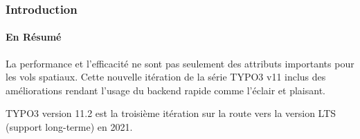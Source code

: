 %

\begin{frame}[fragile]
	\frametitle{Introduction}
	\framesubtitle{En Résumé}

	\small
		La performance et l'efficacité ne sont pas seulement des attributs importants pour les vols spatiaux.
		Cette nouvelle itération de la série TYPO3 v11 inclus des améliorations rendant l'usage
		du backend rapide comme l'éclair et plaisant.

		\vspace{0.2cm}

        TYPO3 version 11.2 est la troisième itération sur la route vers la version LTS
        (support long-terme) en 2021.

	\normalsize

\end{frame}

